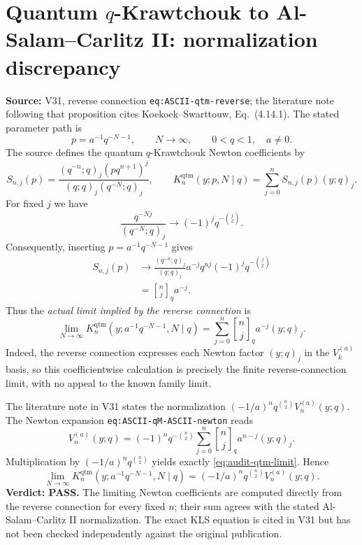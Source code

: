 \documentclass[11pt]{article}
\begin{document}
\section{Quantum $q$-Krawtchouk to Al-Salam--Carlitz II: normalization discrepancy}
\noindent\textbf{Source:} V31, reverse connection \texttt{eq:ASCII-qtm-reverse}; the
literature note following that proposition cites Koekoek--Swarttouw,
Eq.~(4.14.1). The stated parameter path is
\[
 p=a^{-1}q^{-N-1},\qquad N\longrightarrow\infty,
 \qquad 0<q<1,\quad a\ne0.
\]
The source defines the quantum $q$-Krawtchouk Newton coefficients by
\[
 S_{n,j}(p)=\frac{(q^{-n};q)_j(pq^{n+1})^j}
 {(q;q)_j(q^{-N};q)_j},\qquad
 K_n^{\mathrm{qtm}}(y;p,N\mid q)=\sum_{j=0}^n S_{n,j}(p)(y;q)_j.
\]
For fixed $j$ we have
\[
 \frac{q^{-Nj}}{(q^{-N};q)_j}\longrightarrow
 (-1)^j q^{-\binom j2}.
\]
Consequently, inserting $p=a^{-1}q^{-N-1}$ gives
\begin{align*}
 S_{n,j}(p)&\longrightarrow
 \frac{(q^{-n};q)_j}{(q;q)_j}
 a^{-j}q^{nj}(-1)^jq^{-\binom j2}\\
 &=\genfrac{[}{]}{0pt}{}{n}{j}_q a^{-j}.
\end{align*}
Thus the \emph{actual limit implied by the reverse connection} is
\begin{equation}\label{eq:audit-qtm-limit}
 \lim_{N\to\infty}K_n^{\mathrm{qtm}}
 (y;a^{-1}q^{-N-1},N\mid q)
 =\sum_{j=0}^n\genfrac{[}{]}{0pt}{}{n}{j}_q
 a^{-j}(y;q)_j.
\end{equation}
Indeed, the reverse connection expresses each Newton factor $(y;q)_j$
in the $V_k^{(a)}$ basis, so this coefficientwise calculation is
precisely the finite reverse-connection limit, with no appeal to the
known family limit.

The literature note in V31 states the normalization
$(-1/a)^nq^{\binom n2}V_n^{(a)}(y;q)$. The Newton expansion
\texttt{eq:ASCII-qM-ASCII-newton} reads
\[
 V_n^{(a)}(y;q)=(-1)^nq^{-\binom n2}
 \sum_{j=0}^n\genfrac{[}{]}{0pt}{}{n}{j}_q a^{n-j}(y;q)_j.
\]
Multiplication by $(-1/a)^nq^{\binom n2}$ yields exactly
\eqref{eq:audit-qtm-limit}. Hence
\[
 \boxed{\displaystyle
 \lim_{N\to\infty}K_n^{\mathrm{qtm}}
 (y;a^{-1}q^{-N-1},N\mid q)
 =(-1/a)^nq^{\binom n2}V_n^{(a)}(y;q).}
\]
\noindent\textbf{Verdict: PASS.} The limiting Newton coefficients
are computed directly from the reverse connection for every fixed
$n$; their sum agrees with the stated Al-Salam--Carlitz II
normalization. The exact KLS equation is cited in V31 but has not
been checked independently against the original publication.
\end{document}
